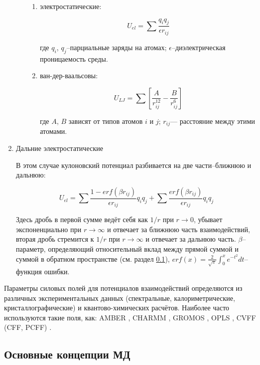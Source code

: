 \begin{enumerate}
\begin{enumerate}
		\begin{enumerate}
	
		\item электростатические:
		
		\[
		U_{el} = \sum \frac{q_{i} q_{j}}{\epsilon r_{ij}}
		\]

		где $q_i$, $q_j$--парциальные заряды на атомах; $\epsilon$--диэлектрическая проницаемость среды.
		
		\item  ван-дер-ваальсовы:
		
		\[
		U_{LJ} = \sum{\left [ \frac{A}{r_{ij}^{12}}-\frac{B}{r_{ij}^{6}} \right ]}
		\]
		
		где $A$, $B$ зависят от типов атомов $i$ и $j$; $r_{ij}$— расстояние между этими атомами.

		\end{enumerate}

	\end{enumerate}

\item  Дальние электростатические

В этом случае кулоновский потенциал разбивается на две части--ближнюю и дальнюю:

\[
U_{el} = \sum { \frac{1 - erf(\beta r_{ij})}{\epsilon r_{ij}}} q_i q_j + \sum {\frac{erf(\beta r_{ij})}{\epsilon r_{ij}}} q_i q_j
\]

Здесь дробь в первой сумме ведёт себя как $1/r$ при $r \to 0$, убывает экспоненциально при $r \to \infty $ и отвечает за ближнюю часть взаимодействий, вторая дробь стремится к $1/r$ при $r \to \infty $ и отвечает за дальнюю часть. $\beta$--параметр, определяющий относительный вклад между прямой суммой и суммой в обратном пространстве (см. раздел \ref{sect_methods_MD_concepts}), $erf(x) = \frac {2}{\sqrt{\pi}} \int_0^x{e^{-t^2} dt}$--функция ошибки.

\end{enumerate}

Параметры силовых полей для потенциалов взаимодействий определяются из различных экспериментальных данных (спектральные, калориметрические, кристаллографические) и квантово-химических расчётов. Наиболее часто используются такие поля, как: AMBER \cite{Cornell1995,Kollman1996,Wang2000,Hornak2006,LindorffLarsen2010,Duan2003,Garcia2002}, CHARMM \cite{Mackerell2004,Mackerell1998,Feller2000,Foloppe2004}, GROMOS \cite{Gunsteren1996}, OPLS \cite{Jorgensen1996}, CVFF (CFF, PCFF) \cite{Hagler1974}.

\subsection{Основные концепции МД} \label{sect_methods_MD_concepts}

